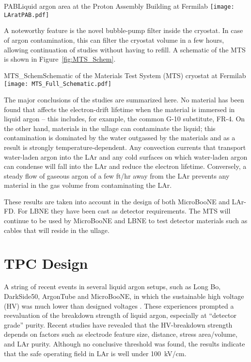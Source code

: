 \begin{cdrfigure}{PAB}{Liquid argon area at the Proton Assembly Building at Fermilab}
\texttt{[image: LAratPAB.pdf]}
\end{cdrfigure}

A noteworthy feature is the novel bubble-pump filter inside the cryostat. In case of argon contamination, this can filter the cryostat volume in a few hours, allowing continuation of studies 
 without having to refill. A schematic of the MTS is shown in Figure~\ref{fig:MTS_Schem}.

\begin{cdrfigure}{MTS_Schem}{Schematic of the Materials Test System (MTS) cryostat at Fermilab}
\texttt{[image: MTS\_Full\_Schematic.pdf]}
\end{cdrfigure}

The major conclusions of the studies are summarized here. No material has been found that affects the electron-drift lifetime when the material is immersed in liquid argon -- this includes, for example, the common G-10 substitute, FR-4. On the other hand, materials in the ullage can contaminate the liquid; this contamination is dominated by the water outgassed by the materials and as a result is strongly temperature-dependent. Any convection currents that transport water-laden argon into the LAr and any cold surfaces on which water-laden argon can condense will fall into the LAr and reduce the electron lifetime. Conversely,  a steady flow of gaseous argon of a few ft/hr away from the LAr prevents any material in the gas volume from contaminating the LAr. 

These results are taken into account in the design of both MicroBooNE and LAr-FD. For LBNE they have been cast as detector requirements. The MTS will continue to be used by MicroBooNE and LBNE to test detector materials such as cables that will reside in the ullage.


\section{TPC Design}

A string of recent events in several liquid argon setups, such as Long Bo, DarkSide50, ArgonTube and MicroBooNE, in which the sustainable high voltage (HV) was much lower  than designed voltages . These experiences prompted a reevaluation of the breakdown strength of liquid argon, especially at ``detector grade'' purity. Recent studies \cite{bib:HV_in_LAr_1}\cite{bib:HV_in_LAr_2} have revealed that the HV-breakdown strength depends on factors such as electrode feature size, distance, stress area/volume, and LAr purity. Although no conclusive threshold was found, the results indicate that the safe operating field in LAr is well under 100~kV/cm.
 
